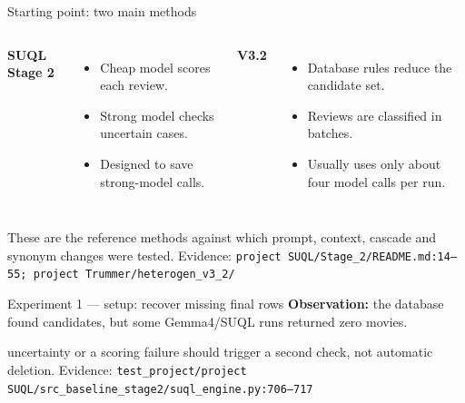 \documentclass[aspectratio=169,10pt]{beamer}
\newcommand{\citecode}[1]{\vfill{\color{soft}\tiny Evidence: \texttt{#1}}}
\begin{document}
\begin{frame}{Starting point: two main methods}
\begin{columns}[T]\textbf{SUQL Stage 2}
\begin{itemize}\item Cheap model scores each review.\item Strong model checks uncertain cases.\item Designed to save strong-model calls.\end{itemize}
\textbf{V3.2}
\begin{itemize}\item Database rules reduce the candidate set.\item Reviews are classified in batches.\item Usually uses only about four model calls per run.\end{itemize}\end{columns}
\vfill
These are the reference methods against which prompt, context, cascade and synonym changes were tested.
\citecode{project SUQL/Stage\_2/README.md:14--55; project Trummer/heterogen\_v3\_2/}
\end{frame}

\begin{frame}{Experiment 1 --- setup: recover missing final rows}
\textbf{Observation:} the database found candidates, but some Gemma4/SUQL runs returned zero movies.
\begin{center}\end{center}
 uncertainty or a scoring failure should trigger a second check, not automatic deletion.
\citecode{test\_project/project SUQL/src\_baseline\_stage2/suql\_engine.py:706--717}
\end{frame}
\end{document}

